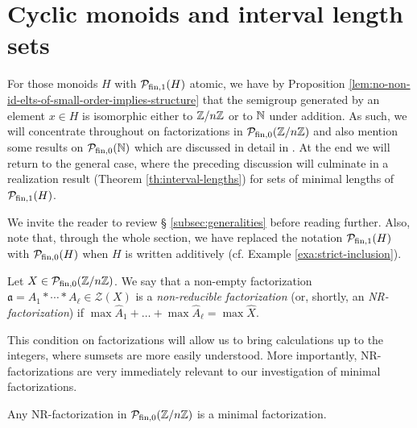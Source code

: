 \section{Cyclic monoids and interval length sets}
\label{sec:cyclic-case} 
For those monoids $H$ with $\mathcal{P}_{\textrm{fin}, 1}(H)$ atomic, we have by Proposition \ref{lem:no-non-id-elts-of-small-order-implies-structure} that the semigroup generated by an element $x\in H$ is isomorphic either to $\mathbb{Z}/n\mathbb{Z}$ or to $\mathbb{N}$ under addition.
As such, we will concentrate throughout on factorizations in $\mathcal{P}_{\textrm{fin},0}(\mathbb{Z}/n\mathbb{Z})$ and also mention some results on $\mathcal{P}_{\textrm{fin},0}(\mathbb{N})$ which are discussed in detail in \cite[\S{ }4]{fan-tringali18}.
At the end we will return to the general case, where the preceding discussion will culminate in a realization result (Theorem \ref{th:interval-lengths}) for sets of minimal lengths of $\mathcal{P}_{\textrm{fin}, 1}(H)$.

We invite the reader to review \S{ }\ref{subsec:generalities} before reading further. Also, note that, through the whole section, we have replaced the notation $\mathcal{P}_{\textrm{fin}, 1}(H)$ with $\mathcal{P}_{\textrm{fin},0}(H)$ when $H$ is written additively (cf. Example \ref{exa:strict-inclusion}).


\begin{defn}\label{NR-factorization}
	Let $X \in \mathcal P_{\textrm{fin},0}(\mathbb{Z}/n\mathbb{Z})$. We say that a non-empty factorization $\mathfrak a = A_1 \ast \cdots \ast A_\ell \in \mathcal{Z}(X)$ is a \emph{non-reducible factorization} (or, shortly, an \emph{\textup{NR}-factorization}) if $ \max\hat{A}_1 + \dots + \max\hat{A}_\ell = \max \hat{X}$.
\end{defn}

This condition on factorizations will allow us to bring calculations up to the integers, where sumsets are more easily understood.
More importantly, NR-factorizations are very immediately relevant to our investigation of minimal factorizations.

\begin{lemma}\label{NR-factorizations-are-minimal}
Any \textup{NR}-factorization in $\mathcal{P}_{\textrm{fin},0}(\mathbb{Z}/n\mathbb{Z})$ is a minimal factorization.
\end{lemma}

